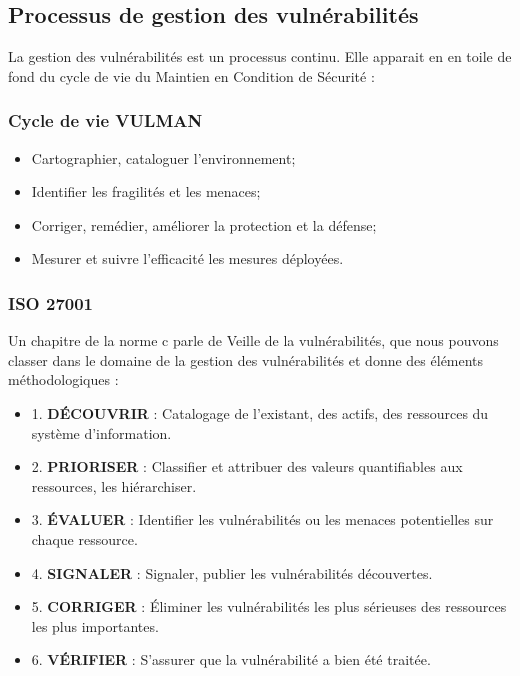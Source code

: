 




\subsection{Processus de gestion des vulnérabilités}

La gestion des vulnérabilités est un processus continu. Elle apparait en en toile de fond du cycle de vie du Maintien en Condition de Sécurité :

\begin{frame}
\frametitle<presentation>{Cycle de vie VULMAN}
\begin{itemize}
	\item Cartographier, cataloguer l'environnement; 
	\item Identifier les fragilités et les menaces;
	\item Corriger, remédier, améliorer la protection et la défense;
	\item Mesurer et suivre l'efficacité les mesures déployées.
\end{itemize}
\end{frame}


\subsubsection{ISO 27001}

Un chapitre de la norme c parle de Veille de la vulnérabilités, que nous pouvons classer dans le domaine de la gestion des vulnérabilités et donne des éléments méthodologiques : 

\begin{itemize}
	\item 1. \textbf{DÉCOUVRIR} : Catalogage de l’existant, des actifs, des ressources du système d’information. 
 	\item 2. \textbf{PRIORISER} : Classifier et attribuer des valeurs quantifiables aux ressources, les hiérarchiser. 
 	\item 3. \textbf{ÉVALUER} : Identifier les vulnérabilités ou les menaces potentielles sur chaque ressource. 
	 \item 4. \textbf{SIGNALER} : Signaler, publier les vulnérabilités découvertes. 
 	\item 5. \textbf{CORRIGER} : Éliminer les vulnérabilités les plus sérieuses des ressources les plus importantes. 
 	\item 6. \textbf{VÉRIFIER} : S’assurer que la vulnérabilité a bien été traitée. 
\end{itemize}

